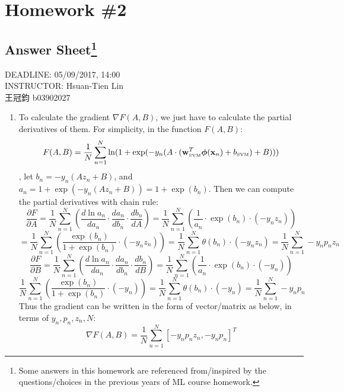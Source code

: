 \documentclass[11pt]{article}
\begin{document}
\section*{Homework \#2}
\subsection*{Answer Sheet\footnote{Some answers in this homework are referenced from/inspired by the questions/choices in the previous years of ML course homework.}}
\begin{center}
DEADLINE: 05/09/2017, 14:00\\
INSTRUCTOR:  Hsuan-Tien Lin\\[0.5cm]
王冠鈞 b03902027
\end{center}


\begin{enumerate}[label=\textbf{\arabic*}.]
	\item To calculate the gradient $\nabla F(A, B)$, we just have to calculate the partial derivatives of them. For simplicity, in the function $F(A, B)$:
  \[F(A, B) = \frac{1}{N} \sum_{n=1}^N \ln (1 + \exp (-y_n (A \cdot (\mathbf{w}_{\text{\tiny{SVM}}}^T\bm{\phi}(\mathbf{x}_n) + b_{\text{\tiny{SVM}}}) + B)))\], let $b_n = -y_n (A z_n + B)$, and $a_n = 1 + \exp (-y_n (A z_n + B)) = 1 + \exp (b_n)$. Then we can compute the partial derivatives with chain rule:
  \[\frac{\partial F}{\partial A} = \frac{1}{N} \sum_{n=1}^N\left( \frac{d\ln{a_n}}{d a_n} \cdot \frac{d a_n}{d b_n} \cdot \frac{d b_n}{dA} \right) = \frac{1}{N} \sum_{n=1}^N \left(\frac{1}{a_n}\cdot \exp{(b_n)} \cdot (-y_nz_n)\right)\] \[= \frac{1}{N} \sum_{n=1}^N \left(\frac{\exp{(b_n)}}{1+\exp{(b_n)}} \cdot (-y_nz_n) \right) = \frac{1}{N} \sum_{n=1}^N \theta (b_n)\cdot (-y_nz_n) = \frac{1}{N} \sum_{n=1}^N -y_np_nz_n  \]
  \[\frac{\partial F}{\partial B} = \frac{1}{N} \sum_{n=1}^N\left( \frac{d\ln{a_n}}{d a_n} \cdot \frac{d a_n}{d b_n} \cdot \frac{d b_n}{dB} \right)= \frac{1}{N} \sum_{n=1}^N \left(\frac{1}{a_n}\cdot \exp{(b_n)} \cdot (-y_n)\right)\] \[\frac{1}{N} \sum_{n=1}^N \left(\frac{\exp{(b_n)}}{1+\exp{(b_n)}} \cdot (-y_n) \right) = \frac{1}{N} \sum_{n=1}^N \theta (b_n)\cdot (-y_n) = \frac{1}{N} \sum_{n=1}^N -y_np_n\]
  Thus the gradient can be written in the form of vector/matrix as below, in terms of $y_n, p_n, z_n, N$:
  \[\nabla F(A, B) = \frac{1}{N} \sum_{n=1}^N [-y_np_nz_n, -y_np_n]^T\]


\end{enumerate}
\end{document}
